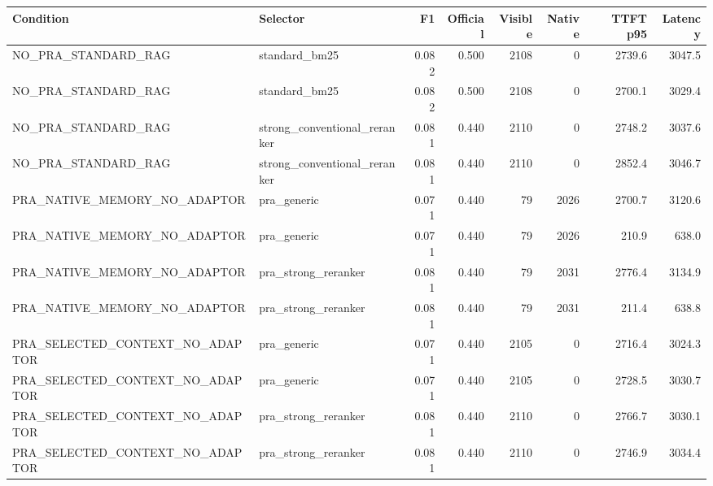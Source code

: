 \begin{tabular}{llrrrrrr}
\toprule
Condition & Selector & F1 & Official & Visible & Native & TTFT p95 & Latency \\
\midrule
NO\_PRA\_STANDARD\_RAG & standard\_bm25 & 0.082 & 0.500 & 2108 & 0 & 2739.6 & 3047.5 \\
NO\_PRA\_STANDARD\_RAG & standard\_bm25 & 0.082 & 0.500 & 2108 & 0 & 2700.1 & 3029.4 \\
NO\_PRA\_STANDARD\_RAG & strong\_conventional\_reranker & 0.081 & 0.440 & 2110 & 0 & 2748.2 & 3037.6 \\
NO\_PRA\_STANDARD\_RAG & strong\_conventional\_reranker & 0.081 & 0.440 & 2110 & 0 & 2852.4 & 3046.7 \\
PRA\_NATIVE\_MEMORY\_NO\_ADAPTOR & pra\_generic & 0.071 & 0.440 & 79 & 2026 & 2700.7 & 3120.6 \\
PRA\_NATIVE\_MEMORY\_NO\_ADAPTOR & pra\_generic & 0.071 & 0.440 & 79 & 2026 & 210.9 & 638.0 \\
PRA\_NATIVE\_MEMORY\_NO\_ADAPTOR & pra\_strong\_reranker & 0.081 & 0.440 & 79 & 2031 & 2776.4 & 3134.9 \\
PRA\_NATIVE\_MEMORY\_NO\_ADAPTOR & pra\_strong\_reranker & 0.081 & 0.440 & 79 & 2031 & 211.4 & 638.8 \\
PRA\_SELECTED\_CONTEXT\_NO\_ADAPTOR & pra\_generic & 0.071 & 0.440 & 2105 & 0 & 2716.4 & 3024.3 \\
PRA\_SELECTED\_CONTEXT\_NO\_ADAPTOR & pra\_generic & 0.071 & 0.440 & 2105 & 0 & 2728.5 & 3030.7 \\
PRA\_SELECTED\_CONTEXT\_NO\_ADAPTOR & pra\_strong\_reranker & 0.081 & 0.440 & 2110 & 0 & 2766.7 & 3030.1 \\
PRA\_SELECTED\_CONTEXT\_NO\_ADAPTOR & pra\_strong\_reranker & 0.081 & 0.440 & 2110 & 0 & 2746.9 & 3034.4 \\
\bottomrule
\end{tabular}
